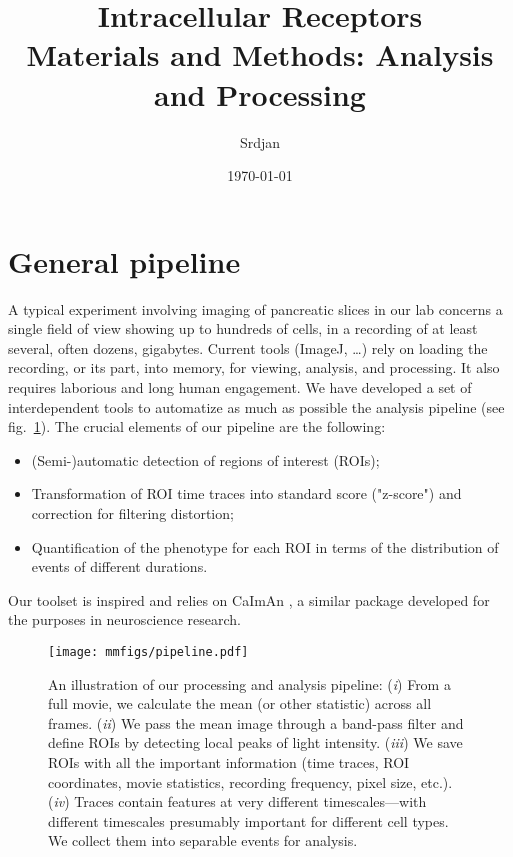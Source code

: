 \documentclass[a4paper,11pt,oneside,]{article}
\title{Intracellular Receptors \\ {\small Materials and Methods: Analysis and Processing}}
\author{Srdjan}
\date{\today}
\begin{document}
\maketitle


\section{General pipeline}

A typical experiment involving imaging of pancreatic slices in our lab concerns a single field of view
showing up to hundreds of cells, in a recording of at least several, often dozens, gigabytes.
Current tools (ImageJ, \dots) rely on loading the recording, or its part, into memory, for viewing, analysis, and processing.
It also requires laborious and long human engagement.
We have developed a set of interdependent tools to automatize as much as possible the analysis pipeline (see fig.~\ref{fig:pipeline}). 
The crucial elements of our pipeline are the following:
\begin{itemize}
\item (Semi-)automatic detection of regions of interest (ROIs);
\item Transformation of ROI time traces into standard score ("z-score") and correction for filtering distortion;
\item Quantification of the phenotype for each ROI in terms of the distribution of events of different durations.
\end{itemize}

Our toolset is inspired and relies on CaImAn \cite{giovannucci2019caiman}, a similar package developed for the purposes in neuroscience research.


\begin{figure}[h]
\centering
\texttt{[image: mmfigs/pipeline.pdf]}
\caption{
\label{fig:pipeline}
An illustration of our processing and analysis pipeline:
({\it i})  From a full movie, we calculate the mean (or other statistic) across all frames.
({\it ii}) We pass the mean image through a band-pass filter and define ROIs by detecting local peaks of light intensity.
({\it iii}) We save ROIs with all the important information (time traces, ROI coordinates, movie statistics, recording frequency, pixel size, etc.).
({\it iv}) Traces contain features at very different timescales---with different timescales presumably important for different cell types. We collect them into separable events for analysis.
}
\end{figure}
\end{document}
